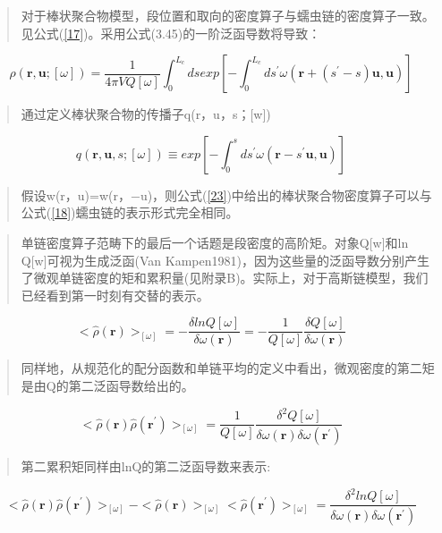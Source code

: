 \begin{quotation}
	对于棒状聚合物模型，段位置和取向的密度算子与蠕虫链的密度算子一致。见公式(\ref{17})。采用公式(3.45)的一阶泛函导数将导致：
\end{quotation}
\begin{equation}\label{23}
\rho(\mathbf{r},\mathbf{u};[\omega])=\frac{1}{4\pi VQ[\omega]}\int_{0}^{L_c}ds exp[-\int_{0}^{L_c}ds^{'}\omega (\mathbf{r}+(s^{'}-s)\mathbf{u},\mathbf{u})]
\end{equation}
\begin{quotation}
	通过定义棒状聚合物的传播子q(r，u，s；[w])
\end{quotation}
\begin{equation}\label{24}
q(\mathbf{r},\mathbf{u},s;[\omega])\equiv exp[-\int_{0}^{s}ds^{'}\omega(\mathbf{r}-s^{'}\mathbf{u},\mathbf{u})]
\end{equation}
\begin{quotation}
	假设w(r，u)=w(r，−u)，则公式(\ref{23})中给出的棒状聚合物密度算子可以与公式(\ref{18})蠕虫链的表示形式完全相同。
\end{quotation}
\begin{quotation}
	单链密度算子范畴下的最后一个话题是段密度的高阶矩。对象Q[w]和ln Q[w]可视为生成泛函(Van Kampen1981)，因为这些量的泛函导数分别产生了微观单链密度的矩和累积量(见附录B)。实际上，对于高斯链模型，我们已经看到第一时刻有交替的表示。
\end{quotation}
\begin{equation}\label{25}
<\hat{\rho}(\mathbf{r})>_{[\omega]}=-\frac{\delta lnQ[\omega]}{\delta \omega(\mathbf{r})}=-\frac{1}{Q[\omega]}\frac{\delta Q[\omega]}{\delta\omega(\mathbf{r})}
\end{equation}
\begin{quotation}
	同样地，从规范化的配分函数和单链平均的定义中看出，微观密度的第二矩是由Q的第二泛函导数给出的。
\end{quotation}
\begin{equation}\label{26}
<\hat{\rho}(\mathbf{r})\hat{\rho}(\mathbf{r}^{'})>_{[\omega]}=\frac{1}{Q[\omega]}\frac{\delta^2 Q[\omega]}{\delta\omega(\mathbf{r})\delta \omega(\mathbf{r}^{'})}
\end{equation}
\begin{quotation}
	第二累积矩同样由lnQ的第二泛函导数来表示:
\end{quotation}
\begin{equation}\label{27}
<\hat{\rho}(\mathbf{r})\hat{\rho}(\mathbf{r}^{'})>_{[\omega]}-<\hat{\rho}(\mathbf{r})>_{[\omega]}<\hat{\rho}(\mathbf{r}^{'})>_{[\omega]}=\frac{\delta^2 lnQ[\omega]}{\delta\omega(\mathbf{r})\delta \omega(\mathbf{r}^{'})}
\end{equation}
